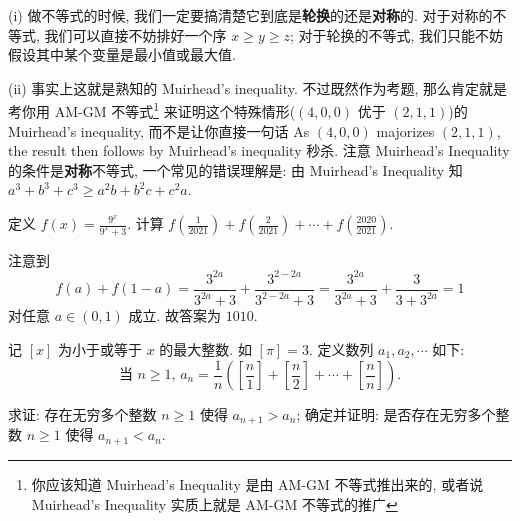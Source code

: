 \documentclass{article}
\begin{document}
\begin{rem}
(i) 做不等式的时候, 我们一定要搞清楚它到底是\textbf{轮换}的还是\textbf{对称}的.
对于对称的不等式, 我们可以直接不妨排好一个序 $x \ge y \ge z$;
对于轮换的不等式, 我们只能不妨假设其中某个变量是最小值或最大值.

(ii) 事实上这就是熟知的 Muirhead's inequality.
不过既然作为考题, 那么肯定就是考你用 AM-GM 不等式\footnote{你应该知道
Muirhead's Inequality 是由 AM-GM 不等式推出来的,
或者说 Muirhead's Inequality 实质上就是 AM-GM 不等式的推广}
来证明这个特殊情形($(4,0,0)$ 优于 $(2,1,1)$)的 Muirhead's inequality,
而不是让你直接一句话
As $(4,0,0)$ majorizes $(2,1,1)$, the result then follows by Muirhead's inequality 秒杀.
注意 Muirhead's Inequality 的条件是\textbf{对称}不等式,
一个常见的错误理解是: 由 Muirhead's Inequality 知 $a^3 + b^3 + c^3 \ge a^2b + b^2c + c^2a$.
\end{rem}

\begin{prob}
定义 $f(x) = \frac{9^x}{9^x + 3}$.
计算 $f(\frac{1}{2021}) + f(\frac{2}{2021}) + \cdots + f(\frac{2020}{2021})$.
\end{prob}

\begin{soln}
注意到
\begin{equation}
\label{eq8}
f(a) + f(1-a) = \frac{3^{2a}}{3^{2a} + 3} + \frac{3^{2-2a}}{3^{2-2a} + 3}
=\frac{3^{2a}}{3^{2a} + 3} + \frac{3}{3 + 3^{2a}} = 1
\end{equation}
对任意 $a \in (0,1)$ 成立.
故答案为 $\boxed{1010.}$
\end{soln}

\begin{prob}
记 $[x]$ 为小于或等于 $x$ 的最大整数. 如 $[\pi] = 3$.
定义数列 $a_1,a_2,\cdots$ 如下:
\[\text{当 $n \ge 1$, } a_n=\frac{1}{n}\left(\left[\frac{n}{1}\right] +\left[\frac{n}{2}\right] + \cdots + \left[\frac{n}{n}\right]\right).\]
\begin{enumerate}[label=(\alph*)]
\ii 求证: 存在无穷多个整数 $n \ge 1$ 使得 $a_{n+1} > a_n$;
\ii 确定并证明: 是否存在无穷多个整数 $n \ge 1$ 使得 $a_{n+1} < a_n$.
\end{enumerate}
\end{prob}
\end{document}
